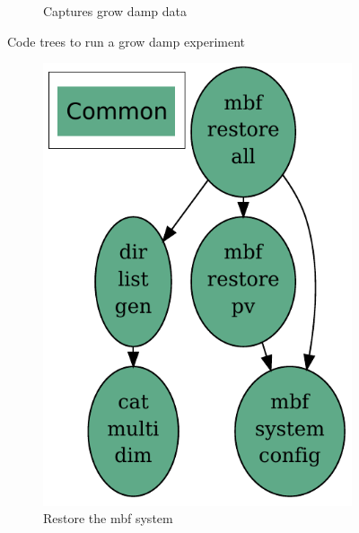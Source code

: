\documentclass{report}
\begin{document}
\begin{figure}[hbt]
\begin{subfigure}[b]{0.45\textwidth}
        \caption{Captures grow damp data}
        \label{fig:growdamp_capture}
    \end{subfigure}
    \caption{Code trees to run a grow damp experiment}\label{fig:growdamp_code_trees1}
\end{figure}

\begin{figure}[hbt]
   \centering
    \begin{subfigure}[b]{0.3\textwidth}
        \includegraphics[width=\textwidth]{mbf_restore_all.pdf}
        \caption{Restore the mbf system }
        \label{fig:restore}
    \end{subfigure}
        \begin{subfigure}[b]{0.3\textwidth}

\end{subfigure}
\end{figure}
\end{document}
